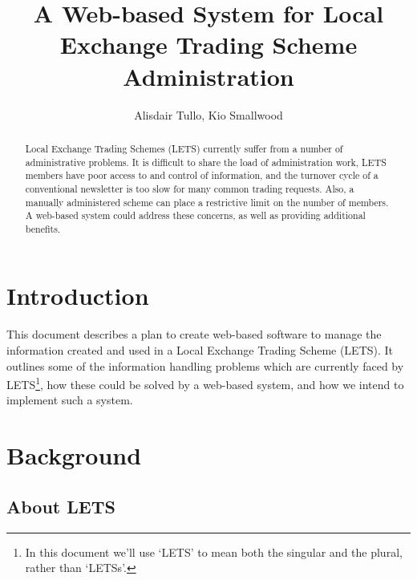 \documentclass[a4paper,11pt]{article}
\begin{document}
\author{Alisdair Tullo, Kio Smallwood}

\title{A Web-based System for \linebreak Local Exchange Trading Scheme \linebreak Administration}

\maketitle

\begin{abstract}

Local Exchange Trading Schemes (LETS) currently suffer from a number of administrative 
problems. It is difficult to share the load of administration work, LETS members have 
poor access to and control of information, and the turnover cycle of a conventional 
newsletter is too slow for many common trading requests. Also, a manually administered 
scheme can place a restrictive limit on the number of members. A web-based system 
could address these concerns, as well as providing additional benefits. 

\end{abstract}

\tableofcontents

\clearpage %

\section{Introduction}

This document describes a plan to create web-based software to manage the information created and used in a Local Exchange Trading Scheme (LETS). It outlines some of the information handling problems which are currently faced by LETS\footnote{In this document we'll use `LETS' to mean both the singular and the plural, rather than `LETSs'.}, how these could be solved by a web-based system, and how we intend to implement such a system.

\clearpage %

\section{Background}

\subsection{About LETS}
\end{document}
